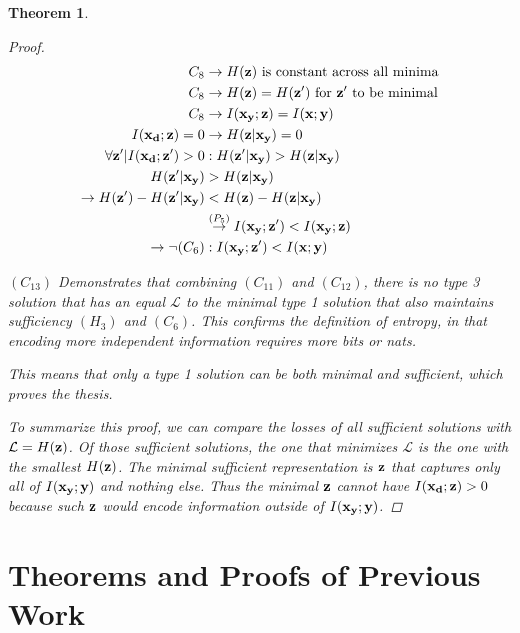 \documentclass[letterpaper]{article} %
\theoremstyle{plain}
\newtheorem{theorem}{Theorem}[section]
\theoremstyle{definition}
\theoremstyle{remark}
\begin{document}
\begin{theorem}
\begin{proof}
$$
\begin{aligned}
    C_8 &\rightarrow  H({\mathbf{z}}) \text{ is constant across all minima}\\
    C_8 &\rightarrow  H({\mathbf{z}}) = H({\mathbf{z}}')\text{ for } {\mathbf{z}}' \text{ to be minimal}\\
    C_8 &\rightarrow  I({\mathbf{x}}_{\mathbf{y}}; {\mathbf{z}}) = I({\mathbf{x}}; {\mathbf{y}})\\
    I({\mathbf{x}}_{\mathbf{d}}; {\mathbf{z}}) = 0 &\rightarrow H({\mathbf{z}}| {\mathbf{x}}_{\mathbf{y}}) = 0 \\
    \forall {\mathbf{z}}'|I({\mathbf{x}}_{\mathbf{d}}; {\mathbf{z}}') > 0  &:  H({\mathbf{z}}'| {\mathbf{x}}_{\mathbf{y}}) > H({\mathbf{z}}| {\mathbf{x}}_{\mathbf{y}}) \\
   H({\mathbf{z}}'| {\mathbf{x}}_{\mathbf{y}}) &> H({\mathbf{z}}| {\mathbf{x}}_{\mathbf{y}}) \\  
   \rightarrow H({\mathbf{z}}') - H({\mathbf{z}}'| {\mathbf{x}}_{\mathbf{y}}) &< H({\mathbf{z}}) - H({\mathbf{z}}| {\mathbf{x}}_{\mathbf{y}})  \\
    &\stackrel{\left(P_5\right)}{\rightarrow}  I({\mathbf{x}}_{\mathbf{y}}; {\mathbf{z}}') < I({\mathbf{x}}_{\mathbf{y}}; {\mathbf{z}})  \\
    \rightarrow \neg (C_6) &:  I({\mathbf{x}}_{\mathbf{y}}; {\mathbf{z}}') < I({\mathbf{x}}; {\mathbf{y}}) 
\end{aligned}
$$

$(C_{13})$ Demonstrates that combining $(C_{11})$ and $(C_{12})$, there is no type 3 solution that has an equal $\mathcal{L}$ to the minimal type 1 solution that also maintains sufficiency $(H_3)$ and $(C_6)$. This confirms the definition of entropy, in that encoding more independent information requires more bits or nats. 

This means that only a type 1 solution can be both minimal and sufficient, which proves the thesis. 

To summarize this proof, we can compare the losses of all sufficient solutions with $\mathcal{L} = H({\mathbf{z}})$. Of those sufficient solutions, the one that minimizes $\mathcal{L}$ is the one with the smallest $H({\mathbf{z}})$. The minimal sufficient representation is ${\mathbf{z}}$ that captures only all of $I({\mathbf{x}}_{\mathbf{y}}; {\mathbf{y}})$ and nothing else. Thus the minimal ${\mathbf{z}}$ cannot have $I({\mathbf{x}}_{\mathbf{d}}; {\mathbf{z}}) > 0$ because such ${\mathbf{z}}$ would encode information outside of $I({\mathbf{x}}_{\mathbf{y}}; {\mathbf{y}})$.



\end{proof}
    \label{genloss}


    
\end{theorem}

\section{Theorems and Proofs of Previous Work}
\end{document}
